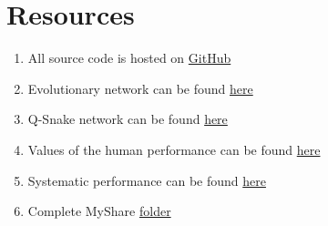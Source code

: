 \documentclass[a4paper]{article}
\begin{document}
\section*{Resources}\label{sec:res}
\begin{enumerate}
\item All source code is hosted on \href{https://github.com/ahoereth/pysnake}{GitHub}
\item Evolutionary network can be found \href{https://myshare.uni-osnabrueck.de/f/9c903b6994/?raw=1}{here}
\item Q-Snake network can be found \href{https://myshare.uni-osnabrueck.de/f/a893e165f0/?raw=1}{here}
\item Values of the human performance can be found \href{https://myshare.uni-osnabrueck.de/f/d24eb213af/?raw=1}{here}
\item Systematic performance can be found \href{https://myshare.uni-osnabrueck.de/f/b3a04d4ac6/?raw=1}{here}
\item Complete MyShare \href{https://myshare.uni-osnabrueck.de/d/a26302e43c/}{folder} 
\end{enumerate}



\end{document}
